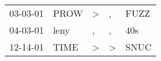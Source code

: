 \begin{supertabular}{lllll}
 03-03-01 &  PROW &  \textgreater &             , &  FUZZ \\
 04-03-01 &  leny &             , &             , &   40s \\
 12-14-01 &  TIME &  \textgreater &  \textgreater &  SNUC \\
\end{supertabular}
